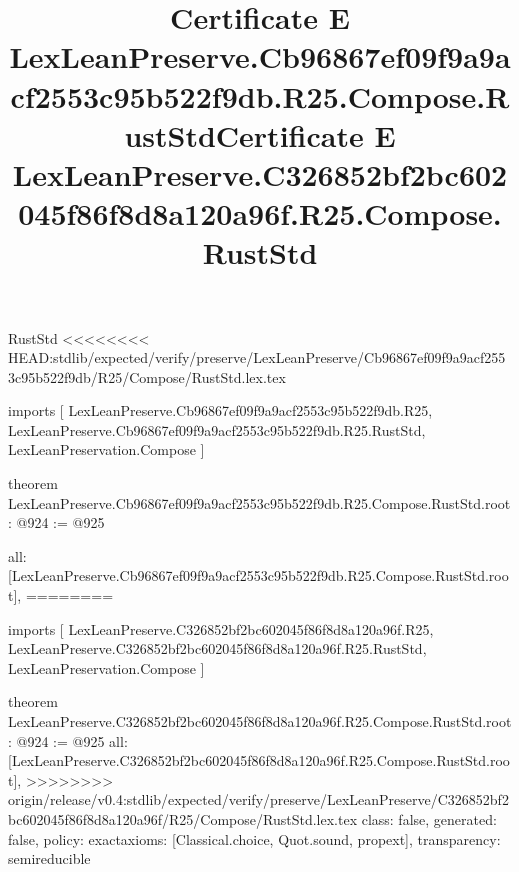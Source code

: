 \begin{lexlean}{RustStd}
<<<<<<<< HEAD:stdlib/expected/verify/preserve/LexLeanPreserve/Cb96867ef09f9a9acf2553c95b522f9db/R25/Compose/RustStd.lex.tex
\title{Certificate E LexLeanPreserve.Cb96867ef09f9a9acf2553c95b522f9db.R25.Compose.RustStd}
\begin{coremodule}
imports [
  LexLeanPreserve.Cb96867ef09f9a9acf2553c95b522f9db.R25,
  LexLeanPreserve.Cb96867ef09f9a9acf2553c95b522f9db.R25.RustStd,
  LexLeanPreservation.Compose
]

theorem LexLeanPreserve.Cb96867ef09f9a9acf2553c95b522f9db.R25.Compose.RustStd.root : @924 := @925 {
  all: [LexLeanPreserve.Cb96867ef09f9a9acf2553c95b522f9db.R25.Compose.RustStd.root],
========
\title{Certificate E LexLeanPreserve.C326852bf2bc602045f86f8d8a120a96f.R25.Compose.RustStd}
\begin{coremodule}
imports [
  LexLeanPreserve.C326852bf2bc602045f86f8d8a120a96f.R25,
  LexLeanPreserve.C326852bf2bc602045f86f8d8a120a96f.R25.RustStd,
  LexLeanPreservation.Compose
]

theorem LexLeanPreserve.C326852bf2bc602045f86f8d8a120a96f.R25.Compose.RustStd.root : @924 := @925 {
  all: [LexLeanPreserve.C326852bf2bc602045f86f8d8a120a96f.R25.Compose.RustStd.root],
>>>>>>>> origin/release/v0.4:stdlib/expected/verify/preserve/LexLeanPreserve/C326852bf2bc602045f86f8d8a120a96f/R25/Compose/RustStd.lex.tex
  class: false,
  generated: false,
  policy: exact{axioms: [Classical.choice, Quot.sound, propext]},
  transparency: semireducible
}


\end{coremodule}}
\end{coremodule}
\end{lexlean}
